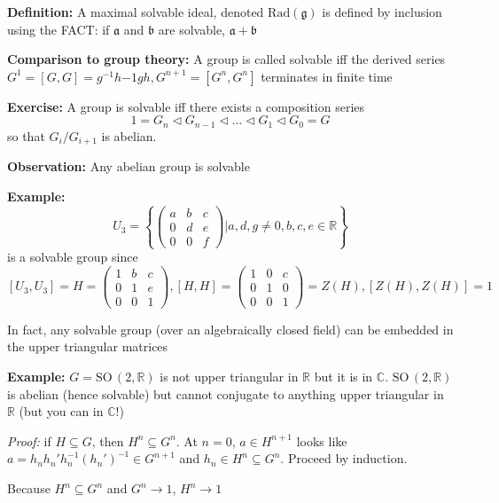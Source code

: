 \documentclass[12pt]{article}
\newcommand{\R}{\mathbb{R}}
\newcommand{\C}{\mathbb{C}}
\newcommand{\SO}{\text{SO}\,}
\newcommand{\g}{\mathfrak{g}}
\newenvironment*{tbox}[2][gray]{
    \begin{tcolorbox}[
        parbox=false,
        colback=#1!5!white,
        colframe=#1!75!black,
        breakable,
        title={#2}
    ]}
    {\end{tcolorbox}}
\begin{document}
    \textbf{Definition:} A maximal solvable ideal, denoted $\text{Rad}(\g)$ is defined by inclusion using the FACT: if $\mathfrak{a}$ and $\mathfrak{b}$ are solvable, $\mathfrak{a} + \mathfrak{b}$

    \textbf{Comparison to group theory:}  A group is called solvable iff the derived series $G^1 = [G, G] = g^{-1}h{-1}gh, G^{n+1} = [G^n, G^n]$ terminates in finite time 


    \textbf{Exercise:} A group is solvable iff there exists a composition series 
    \[1 = G_n \triangleleft G_{n-1} \triangleleft \dots \triangleleft G_1 \triangleleft G_0 = G\]
    so that $G_i/G_{i+1}$ is abelian. 

    \textbf{Observation:} Any abelian group is solvable 

    \textbf{Example:} 
    \[U_3 = \left\{\begin{pmatrix}
        a & b & c\\ 
        0 & d & e\\ 
        0& 0 & f
    \end{pmatrix}\bigg\vert a, d, g \neq 0, b, c, e \in \R\right\}\] 
    is a solvable group since 
    \[[U_3, U_3] = H = \begin{pmatrix}
        1 & b & c\\ 
        0 & 1 & e\\ 
        0 & 0 & 1
    \end{pmatrix}, [H, H] = \begin{pmatrix}
        1 & 0 & c\\ 
        0 & 1 & 0\\
        0 & 0 & 1
    \end{pmatrix} = Z(H), [Z(H), Z(H)] = 1\]

    In fact, any solvable group (over an algebraically closed field) can be embedded in the upper triangular matrices 

    \textbf{Example:} $G = \SO(2, \R)$ is not upper triangular in $\R$ but it is in $\C$. $\SO(2, \R)$ is abelian (hence solvable) but cannot conjugate to anything upper triangular in $\R$ (but you can in $\C$!)

    \begin{tbox}{\textbf{Lemma:} If $H \subseteq G$ and $G$ is solvable, then $H$ is solvable}
        \emph{Proof:} if $H \subseteq G$, then $H^n \subseteq G^n$. At $n =0$, $a \in H^{n+1}$ looks like $a = h_nh_n'h_n^{-1}(h_n')^{-1} \in G^{n+1}$ and $h_n \in H^n \subseteq G^n$. Proceed by induction.
        
        Because $H^n \subseteq G^n$ and $G^n \to 1$, $H^n \to 1$ 
    \end{tbox}
\end{document}
